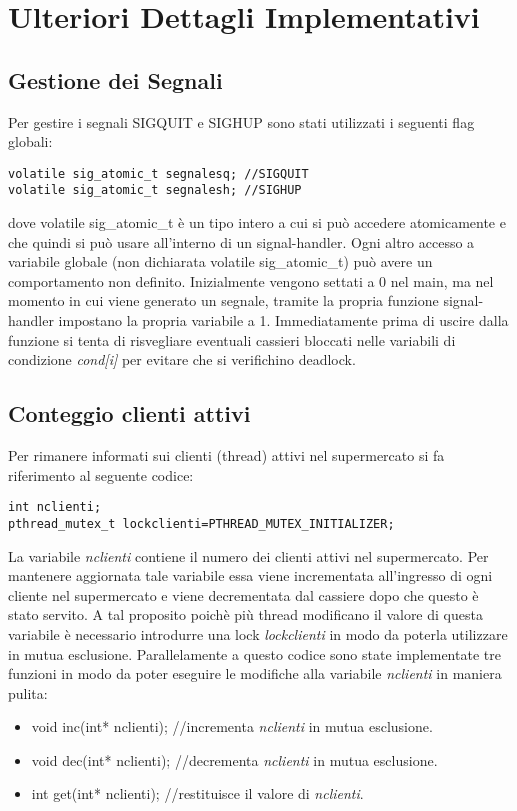 \documentclass{article} %
\begin{document}
\section{Ulteriori Dettagli Implementativi}
\subsection{Gestione dei Segnali}
Per gestire i segnali SIGQUIT e SIGHUP sono stati utilizzati i seguenti flag globali:

\begin{lstlisting}
volatile sig_atomic_t segnalesq; //SIGQUIT
volatile sig_atomic_t segnalesh; //SIGHUP
\end{lstlisting}
dove volatile sig\_atomic\_t è un tipo intero a cui si può accedere atomicamente e che quindi si può usare all'interno di un signal-handler. Ogni altro accesso a variabile globale (non dichiarata volatile sig\_atomic\_t) può avere un comportamento non definito.
Inizialmente vengono settati a 0 nel main, ma nel momento in cui viene generato un segnale, tramite la propria funzione signal-handler impostano la propria variabile a 1. Immediatamente prima di uscire dalla funzione si tenta di risvegliare eventuali cassieri bloccati nelle variabili di condizione {\itshape cond[i]} per evitare che si verifichino deadlock. 
\subsection{Conteggio clienti attivi}
Per rimanere informati sui clienti (thread) attivi nel supermercato si fa riferimento al seguente codice:
\begin{lstlisting}
int nclienti;
pthread_mutex_t lockclienti=PTHREAD_MUTEX_INITIALIZER;  
\end{lstlisting}
La variabile {\itshape nclienti} contiene il numero dei clienti attivi nel supermercato. Per mantenere aggiornata tale variabile essa viene incrementata all'ingresso di ogni cliente nel supermercato e viene decrementata dal cassiere dopo che questo è stato servito. A tal proposito poichè più thread modificano il valore di questa variabile è necessario introdurre una lock {\itshape lockclienti} in modo da poterla utilizzare in mutua esclusione. Parallelamente a questo codice sono state implementate tre funzioni in modo da poter eseguire le modifiche alla variabile {\itshape nclienti} in maniera pulita:
\begin{itemize}
 \item void inc(int* nclienti); //incrementa {\itshape nclienti} in mutua esclusione. 
 \item void dec(int* nclienti); //decrementa {\itshape nclienti} in mutua esclusione.
 \item int get(int* nclienti); //restituisce il valore di {\itshape nclienti}.
 \end{itemize} 
\end{document}
